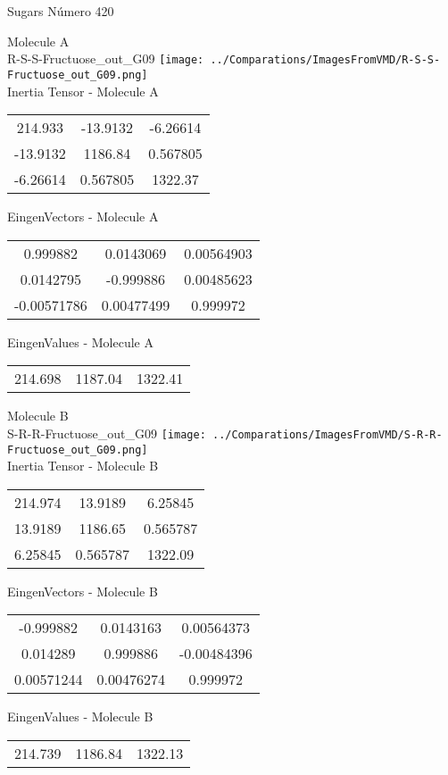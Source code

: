 \vtab[-2cm]
\begin{center}
{\large Sugars \tab Número 420}
\end{center}
\begin{multicols}{2}
\begin{center}

Molecule A \\ 
R-S-S-Fructuose\_out\_G09
\texttt{[image: ../Comparations/ImagesFromVMD/R-S-S-Fructuose\_out\_G09.png]}
\\
Inertia Tensor - Molecule A \\
\vtab

\begin{tabular}{|c c c|}
214.933	 & 	-13.9132	 & 	-6.26614	 \\
-13.9132	 & 	1186.84	 & 	0.567805	 \\
-6.26614	 & 	0.567805	 & 	1322.37
\end{tabular}

\vtab
 EingenVectors - Molecule A     \\
\vtab
\begin{tabular}{|c c c|}
0.999882	 & 	0.0143069	 & 	0.00564903	 \\
0.0142795	 & 	-0.999886	 & 	0.00485623	 \\
-0.00571786	 & 	0.00477499	 & 	0.999972
\end{tabular}

\vtab
 EingenValues - Molecule A     \\
\vtab
\begin{tabular}{|c c c|}
214.698	 & 	1187.04	 & 	1322.41	 \\
\end{tabular}
\columnbreak

Molecule B \\ 
S-R-R-Fructuose\_out\_G09
\texttt{[image: ../Comparations/ImagesFromVMD/S-R-R-Fructuose\_out\_G09.png]}
\\
Inertia Tensor - Molecule B \\
\vtab

\begin{tabular}{|c c c|}
214.974	 & 	13.9189	 & 	6.25845	 \\
13.9189	 & 	1186.65	 & 	0.565787	 \\
6.25845	 & 	0.565787	 & 	1322.09
\end{tabular}

\vtab
 EingenVectors - Molecule B     \\
\vtab
\begin{tabular}{|c c c|}
-0.999882	 & 	0.0143163	 & 	0.00564373	 \\
0.014289	 & 	0.999886	 & 	-0.00484396	 \\
0.00571244	 & 	0.00476274	 & 	0.999972
\end{tabular}

\vtab
 EingenValues - Molecule B     \\
\vtab
\begin{tabular}{|c c c|}
214.739	 & 	1186.84	 & 	1322.13	 \\
\end{tabular}

\end{center}
\end{multicols}
